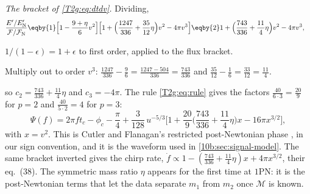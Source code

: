 \emph{The bracket of \eqref{T2g:eq:dtdv}.} Dividing,
\begin{align}
  \frac{E'/E_{\rm N}'}{\mathcal F/\mathcal F_{\rm N}}
  &\eqby{1}\Big[1-\frac{9+\eta}{6}v^2\Big]\Big[1+\Big(\frac{1247}{336}+\frac{35}{12}\eta\Big)v^2-4\pi v^3\Big]
  \eqby{2}1+\Big(\frac{743}{336}+\frac{11}{4}\eta\Big)v^2-4\pi v^3,
\end{align}
\begin{explain}
  \item $1/(1-\epsilon)=1+\epsilon$ to first order, applied to the flux bracket.
  \item Multiply out to order $v^3$: $\tfrac{1247}{336}-\tfrac96=\tfrac{1247-504}{336}=\tfrac{743}{336}$ and $\tfrac{35}{12}-\tfrac16=\tfrac{33}{12}=\tfrac{11}{4}$.
\end{explain}
so $c_2=\tfrac{743}{336}+\tfrac{11}{4}\eta$ and $c_3=-4\pi$. The rule \eqref{T2g:eq:rule} gives the factors $\tfrac{40}{6\cdot3}=\tfrac{20}{9}$ for $p=2$ and $\tfrac{40}{5\cdot2}=4$ for $p=3$:
\begin{equation}
  \Psi(f)=2\pi ft_c-\phi_c-\frac\pi4+\frac{3}{128}\,u^{-5/3}\Big[1+\frac{20}{9}\Big(\frac{743}{336}+\frac{11}{4}\eta\Big)x-16\pi x^{3/2}\Big],
  \label{T2g:eq:psi-pn}
\end{equation}
with $x=v^2$. This is Cutler and Flanagan's restricted post-Newtonian phase \cite[eq.~(42)]{CutlerFlanagan1994}, in our sign convention, and it is the waveform used in \cref{10b:sec:signal-model}. The same bracket inverted gives the chirp rate, $\dot f\propto1-(\tfrac{743}{336}+\tfrac{11}4\eta)x+4\pi x^{3/2}$, their eq.~(38). The symmetric mass ratio $\eta$ appears for the first time at $1$PN: it is the post-Newtonian terms that let the data separate $m_1$ from $m_2$ once $\mathcal M$ is known.

